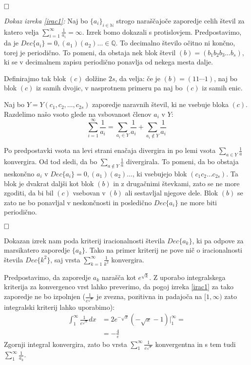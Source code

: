 \documentclass[a4paper,12pt]{article}
\def\N{\mathbb{N}} %
\def\Q{\mathbb{Q}} %
\def\qed{$\hfill\Box$}   %
\begin{document}
\qed

\noindent
{\em Dokaz izreka \ref{irac1}:\/} Naj bo $\{a_i\}_{i\in \N}$ strogo naraščajoče zaporedje
celih števil za katero velja $\sum_{i=1}^{\infty}\frac{1}{a_i} = \infty$. Izrek bomo dokazali
s protislovjem. Predpostavimo, da je $Dec\{a_i\} = 0,(a_1)(a_2) \dots \in \Q$. To decimalno
število očitno ni končno, torej je periodično. 
To pomeni, da obstaja nek blok števil $(b) = (b_1b_2b_3 \dots b_s)$,
ki se v decimalnem zapisu periodično ponavlja od nekega mesta dalje. 

Definirajmo tak blok $(c)$ dolžine $2s$, da velja: če je $(b) = (11 \cdots 1)$, naj bo blok $(c)$
iz samih dvojic, v nasprotnem primeru pa naj bo $(c)$ iz samih enic.

Naj bo $Y = Y(c_1, c_2, \dots, c_{2s})$ zaporedje naravnih števil, ki ne vsebuje bloka $(c)$.
Razdelimo našo vsoto glede na vsbovanost členov $a_i$ v $Y$:
\[
    \sum_{i=1}^{\infty} \frac{1}{a_i} = \sum_{a_i \in Y}\frac{1}{a_i} + \sum_{a_i \notin Y} \frac{1}{a_i}
    \]

Po predpostavki vsota na levi strani enačaja divergira in po lemi vsota $\sum_{a \in Y}\frac{1}{a}$
konvergira. Od tod sledi, da bo $\sum_{a \notin Y} \frac{1}{a}$ divergirala.
To pomeni, da bo obstaja neskončno $a_i$ v $Dec\{a_i\} = 0,(a_1)(a_2) \dots$, ki vsebujejo blok 
$(c_1c_2\dots c_{2s})$. Ta blok je dvakrat daljši kot blok $(b)$ in z drugačnimi števkami, zato se ne more
zgoditi, da bi bil $(c)$ vsebovan v $(b)$ ali sestavljal njegove dele. 
Blok $(b)$ se zato ne bo ponavljal v neskončnosti in posledično $Dec\{a_i\}$ ne more biti periodično.

\qed


Dokazan izrek nam poda kriterij iracionalnosti števila $Dec\{a_k\}$,
ki pa odpove za marsikatero zaporedje $\{a_k\}$.
Tako na primer kriterij ne pove nič o iracionalnosti števila $Dec\{k^2\}$, saj vrsta $\sum_{k=1}^{\infty}\frac{1}{k^2}$ konvergira.

Predpostavimo, da zaporedje $a_k$ narašča kot $e^{\sqrt{k}}$.
Z uporabo integralskega kriterija za konvergenco vrst lahko preverimo, da pogoj izreka \ref{irac1}
za tako zaporedje ne bo izpolnjen
($\frac{1}{e^{\sqrt{x}}}$ je zvezna, pozitivna in padajoča na $[1, \infty)$ zato
integralski kriterij lahko uporabimo):
\[
    \begin{split}
    \int_1^{\infty}\frac{1}{e^{\sqrt{x}}}dx &= 2e^{-\sqrt{x}}(- \sqrt{x} - 1) \big|_1^{\infty} = \\
    &= -\frac{4}{e}
    \end{split}
\]
Zgornji integral konvergira, zato bo vrsta $\sum_1^{\infty}\frac{1}{e^{\sqrt{x}}}$ konvergentna
in s tem tudi $\sum_1^{\infty}\frac{1}{a_k}$.
\end{document}

